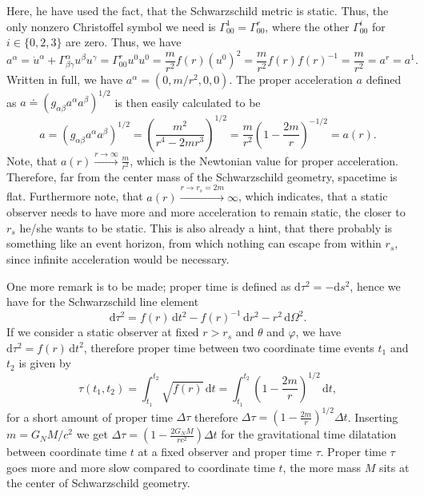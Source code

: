 \documentclass[a4paper,11pt]{article}
\numberwithin{equation}{section}
\begin{document}
{\begin{align}
\begin{aligned}
\end{aligned}
\end{align} Here, he have used the fact, that the Schwarzschild metric is static. Thus, the only nonzero Christoffel symbol we need is $\Gamma^{1}_{00} = \Gamma^r_{00}$, where the other $\Gamma^i_{00}$ for $i \in \{0,2,3\}$ are zero. Thus, we have \begin{equation}
a^\alpha = \dot{u}^\alpha + \Gamma^{\alpha}_{\beta\gamma}u^\beta u^\gamma = \Gamma^r_{00} u^0 u^0 = \frac{m}{r^2}f(r)(u^0)^2 = \frac{m}{r^2}f(r) f(r)^{-1} = \frac{m}{r^2} = a^r = a^1.
\end{equation} Written in full, we have $a^\alpha = (0, m/r^2, 0, 0)$. The proper acceleration $a$ defined as $a \doteq \left(g_{\alpha\beta}a^\alpha a^\beta\right)^{1/2}$ is then easily calculated to be \begin{equation}
a = \left(g_{\alpha\beta}a^\alpha a^\beta\right)^{1/2} = \left(\frac{m^2}{r^4-2mr^3}\right)^{1/2} = \frac{m}{r^2}\left(1-\frac{2m}{r}\right)^{-1/2} = a(r).
\end{equation} Note, that $a(r) \xrightarrow{r\rightarrow \infty} \frac{m}{r^2}$, which is the Newtonian value for proper acceleration. Therefore, far from the center mass of the Schwarzschild geometry, spacetime is flat. Furthermore note, that $a(r) \xrightarrow{r\rightarrow r_s = 2m} \infty$, which indicates, that a static observer needs to have more and more acceleration to remain static, the closer to $r_s$ he/she wants to be static. This is also already a hint, that there probably is something like an event horizon, from which nothing can escape from within $r_s$, since infinite acceleration would be necessary.

One more remark is to be made; proper time is defined as $\mathrm{d}\tau^2 = -\mathrm{d}s^2$, hence we have for the Schwarzschild line element \begin{equation}
\mathrm{d}\tau^2 = f(r)\,\mathrm{d}t^2 - f(r)^{-1}\,\mathrm{d}r^2 - r^2\,\mathrm{d}\Omega^2.
\end{equation} If we consider a static observer at fixed $r > r_s$ and $\theta$ and $\varphi$, we have $\mathrm{d}\tau^2 = f(r)\,\mathrm{d}t^2$, therefore proper time between two coordinate time events $t_1$ and $t_2$ is given by \begin{equation}
\tau(t_1,t_2) = \int_{t_1}^{t_2}\sqrt{f(r)}\,\mathrm{d}t = \int_{t_1}^{t_2}\left(1-\frac{2m}{r}\right)^{1/2}\,\mathrm{d}t, 
\end{equation} for a short amount of proper time $\Delta \tau$ therefore $\Delta \tau = \left(1-\frac{2m}{r}\right)^{1/2}\Delta t$. Inserting $m = G_N M/c^2$ we get $\Delta \tau = \left(1-\frac{2G_NM}{r c^2}\right)\Delta t$ for the gravitational time dilatation between coordinate time $t$ at a fixed observer and proper time $\tau$. Proper time $\tau$ goes more and more slow compared to coordinate time $t$, the more mass $M$ sits at the center of Schwarzschild geometry.
}
\end{document}
